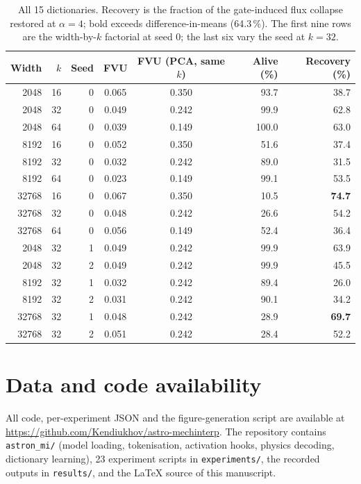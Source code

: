 \documentclass[11pt]{article}
\begin{document}
\begin{table}[H]
\centering\small
\caption{All 15 dictionaries. Recovery is the fraction of the gate-induced flux collapse restored
at $\alpha=4$; bold exceeds difference-in-means (64.3\,\%). The first nine rows are the
width-by-$k$ factorial at seed 0; the last six vary the seed at $k=32$.}
\label{tab:sweep}
\begin{tabular}{rrrccrr}
\toprule
Width & $k$ & Seed & FVU & FVU (PCA, same $k$) & Alive (\%) & Recovery (\%) \\
\midrule
2048 & 16 & 0 & 0.065 & 0.350 & 93.7 & 38.7 \\
2048 & 32 & 0 & 0.049 & 0.242 & 99.9 & 62.8 \\
2048 & 64 & 0 & 0.039 & 0.149 & 100.0 & 63.0 \\
8192 & 16 & 0 & 0.052 & 0.350 & 51.6 & 37.4 \\
8192 & 32 & 0 & 0.032 & 0.242 & 89.0 & 31.5 \\
8192 & 64 & 0 & 0.023 & 0.149 & 99.1 & 53.5 \\
32768 & 16 & 0 & 0.067 & 0.350 & 10.5 & \textbf{74.7} \\
32768 & 32 & 0 & 0.048 & 0.242 & 26.6 & 54.2 \\
32768 & 64 & 0 & 0.056 & 0.149 & 52.4 & 36.4 \\
2048 & 32 & 1 & 0.049 & 0.242 & 99.9 & 63.9 \\
2048 & 32 & 2 & 0.049 & 0.242 & 99.9 & 45.5 \\
8192 & 32 & 1 & 0.032 & 0.242 & 89.4 & 26.0 \\
8192 & 32 & 2 & 0.031 & 0.242 & 90.1 & 34.2 \\
32768 & 32 & 1 & 0.048 & 0.242 & 28.9 & \textbf{69.7} \\
32768 & 32 & 2 & 0.051 & 0.242 & 28.4 & 52.2 \\
\bottomrule
\end{tabular}
\end{table}

\section*{Data and code availability}

All code, per-experiment JSON and the figure-generation script are available at
\url{https://github.com/Kendiukhov/astro-mechinterp}. The
repository contains \texttt{astron\_mi/} (model loading, tokenisation, activation hooks, physics
decoding, dictionary learning), 23 experiment scripts in \texttt{experiments/}, the recorded
outputs in \texttt{results/}, and the \LaTeX{} source of this manuscript.
\end{document}
